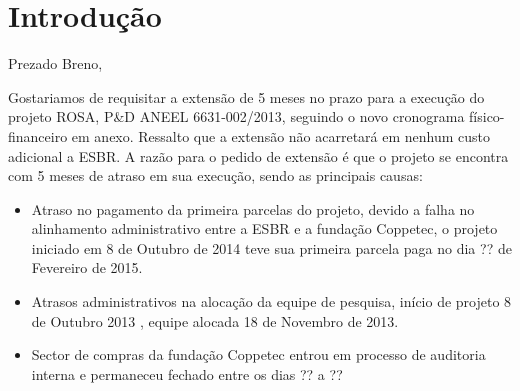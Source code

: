 
\section{Introdução}
\label{intro}

Prezado Breno, 


Gostariamos de  requisitar a extensão de 5 meses no prazo para a execução do projeto ROSA, P\&D ANEEL 6631-002/2013, seguindo o novo cronograma físico-financeiro em anexo. Ressalto que a extensão não acarretará em nenhum custo adicional a ESBR.  A razão para o pedido de extensão é que o projeto se encontra com 5 meses de atraso em sua execução, sendo as principais causas:  

\begin{itemize}
	
	\item	Atraso no pagamento da primeira parcelas do projeto, devido a falha no alinhamento administrativo entre a ESBR e a fundação Coppetec, o projeto iniciado em 8 de Outubro de 2014 teve sua primeira parcela paga no dia ?? de Fevereiro de 2015. 

	\item Atrasos administrativos na alocação da equipe de pesquisa, início de projeto 8 de Outubro 2013 , equipe alocada 18 de Novembro de 2013.
	
	\item	Sector de compras da fundação Coppetec entrou em processo de auditoria interna e permaneceu fechado entre os dias ?? a ?? 



\end{itemize}
